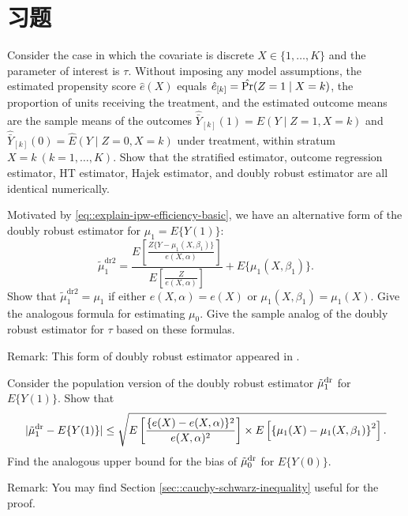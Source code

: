 \section{习题}\label{sec:12-homework}

\begin{HomeworkProblem}\label{exr:12-1}
Consider the case in which the covariate is discrete $X \in \{1, \ldots, K\}$ and the parameter of interest is $\tau$. Without imposing any model assumptions, the estimated propensity score $\hat{e}(X)$ equals $\hat{e}_{[k]} = \hat{\operatorname{Pr}}(Z=1\mid X=k) $, the proportion of units receiving the treatment, and the estimated outcome means are the sample means of the outcomes $\hat{\bar{Y}}_{[k]}(1)  = \hat{E}(Y\mid Z=1, X=k) $ and $\hat{\bar{Y}}_{[k]}(0)  = \hat{E}(Y\mid Z=0, X=k) $ under treatment, within stratum $X=k\ (k=1, \ldots, K)$. Show that the stratified estimator, outcome regression estimator, HT estimator, Hajek estimator, and doubly robust estimator are all identical numerically.



\end{HomeworkProblem}

\begin{HomeworkProblem}\label{exr:12-2}

Motivated by \eqref{eq::explain-ipw-efficiency-basic}, we have an alternative form of the doubly robust estimator for $\mu_1 = E\{ Y(1) \} $:
\[
\tilde{\mu}_1^\text{dr2} =
\frac{ E\left[   \frac{Z\{ Y-\mu_1(X,\beta_1) \}}{  e(X,\alpha) } \right] }{E\left[   \frac{Z }{  e(X,\alpha) } \right]}
 + E\{ \mu_1(X, \beta_1)  \} .
\]
Show that $\tilde{\mu}_1^\text{dr2} = \mu_1$ if either $e(X,\alpha)  = e(X)$ or $\mu_1(X, \beta_1) =  \mu_1(X)$. Give the analogous formula for estimating $\mu_0$. Give the sample analog of the doubly robust estimator for $\tau$ based on these formulas.

Remark:
This form of doubly robust estimator appeared in \citet{robins2007comment}.



\end{HomeworkProblem}

\begin{HomeworkProblem}\label{exr:12-3}


Consider the population version of the doubly robust estimator $\tilde{\mu}_1^\textup{dr} $ for $E\{  Y(1) \} $.
Show that
\[
 |   \tilde{\mu}_1^\textup{dr} - E\{  Y(1) \}  |  \leq
\sqrt{
E\left[   \frac{ \{  e(X) - e(X,\alpha)\}^2  }{  e(X,\alpha)^2 }  \right] \times
E\left[  \left\{  \mu_1(X) -  \mu_1(X, \beta_1)   \right\}^2 \right] .
}
\]
Find the analogous upper bound for the bias of $\tilde{\mu}_0^\textup{dr} $ for $E\{  Y(0) \} $.


Remark: You may find Section \ref{sec::cauchy-schwarz-inequality} useful for the proof.


\end{HomeworkProblem}

